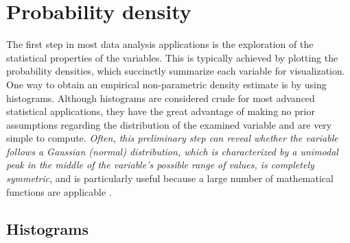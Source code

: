   \section{Probability density}
  The first step in most data analysis applications is the exploration of the statistical properties of the variables. This is typically achieved   by plotting the probability densities, which succinctly summarize each variable for visualization. One way to obtain an empirical non-parametric density estimate is by using histograms. Although histograms are considered crude for most advanced statistical applications, they have the great advantage of making no prior assumptions regarding the distribution of the examined variable and are very simple to compute. \textit{Often, this preliminary step can reveal whether the variable follows a Gaussian (normal) distribution, which is characterized by a unimodal peak in the middle of the variable’s possible range of values, is completely symmetric}, and is particularly useful because a large number of mathematical functions are applicable \cite{bishop}.

\subsection{Histograms}

